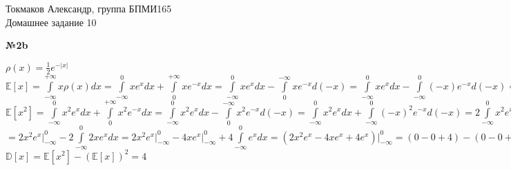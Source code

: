 \documentclass{article}
\newcommand{\E}[1]{\mathbb{E}[ #1 ]}
\newcommand{\D}[1]{\mathbb{D}[ #1 ]}
\newenvironment{task}{\begin{center}\fontsize{14}{14}\selectfont\bf}{\rm\fontsize{12}{12}\selectfont\end{center}}
\begin{document}
	\begin{center}
		Токмаков Александр, группа БПМИ165 \\
		Домашнее задание 10
	\end{center}
	
	\begin{task} 
		№2b
	\end{task}
	\begin{center}
		$\rho(x) = \frac{1}{2}e^{-|x|}$ \\\vspace{5px}
		$\E{x} = \int\limits_{-\infty}^{+\infty}x\rho(x)dx 
		 = \int\limits_{-\infty}^{0}xe^{x}dx + \int\limits_{0}^{+\infty}xe^{-x}dx
		 = \int\limits_{-\infty}^{0}xe^{x}dx - \int\limits_{0}^{-\infty}xe^{-x}d(-x) 
		 = \int\limits_{-\infty}^{0}xe^{x}dx - \int\limits_{-\infty}^{0}(-x)e^{-x}d(-x)
		 = 0$ \\\vspace{5px}
		$\E{x^2}
		= \int\limits_{-\infty}^{0}x^2e^{x}dx + \int\limits_{0}^{+\infty}x^2e^{-x}dx
		= \int\limits_{-\infty}^{0}x^2e^{x}dx - \int\limits_{0}^{-\infty}x^2e^{-x}d(-x) 
		= \int\limits_{-\infty}^{0}x^2e^{x}dx + \int\limits_{-\infty}^{0}(-x)^2e^{-x}d(-x)
		= 2\int\limits_{-\infty}^{0}x^2e^{x}dx =$\\\vspace{3px}$
		= 2x^2e^x \Big|_{-\infty}^{0} - 2\int\limits_{-\infty}^{0}2xe^{x}dx
		= 2x^2e^x \Big|_{-\infty}^{0} - 4xe^x \Big|_{-\infty}^{0} + 4\int\limits_{-\infty}^{0}e^{x}dx
		= (2x^2e^x - 4xe^x + 4e^x) \Big|_{-\infty}^{0} = (0 - 0 + 4) - (0 - 0 + 0) = 4$ \\\vspace{5px}
		$\D{x} = \E{x^2} - (\E{x})^2 = 4$
	\end{center}
	
	
\end{document}

